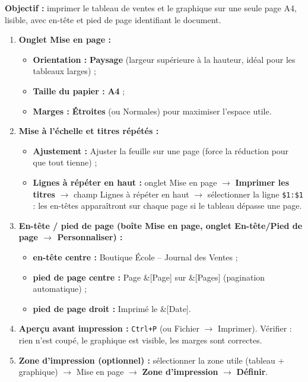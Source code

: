 \documentclass[11pt]{article}
\begin{document}
\begin{methode}
\textbf{Objectif :} imprimer le tableau de ventes et le graphique sur une seule page A4, lisible, avec en-tête et pied de page identifiant le document.
\begin{enumerate}
    \item \textbf{Onglet Mise en page :}
    \begin{itemize}
        \item \textbf{Orientation :} \textbf{Paysage} (largeur supérieure à la hauteur, idéal pour les tableaux larges) ;
        \item \textbf{Taille du papier :} \textbf{A4} ;
        \item \textbf{Marges :} \textbf{Étroites} (ou Normales) pour maximiser l'espace utile.
    \end{itemize}
    \item \textbf{Mise à l'échelle et titres répétés :}
    \begin{itemize}
        \item \textbf{Ajustement :} \og{}Ajuster la feuille sur une page\fg{} (force la réduction pour que tout tienne) ;
        \item \textbf{Lignes à répéter en haut :} onglet Mise en page $\rightarrow$ \textbf{Imprimer les titres} $\rightarrow$ champ \og{}Lignes à répéter en haut\fg{} $\rightarrow$ sélectionner la ligne \texttt{\$1:\$1} : les en-têtes apparaîtront sur chaque page si le tableau dépasse une page.
    \end{itemize}
    \item \textbf{En-tête / pied de page (boîte \og{}Mise en page\fg{}, onglet En-tête/Pied de page $\rightarrow$ Personnaliser) :}
    \begin{itemize}
        \item \textbf{en-tête centre :} \og{}Boutique École -- Journal des Ventes\fg{} ;
        \item \textbf{pied de page centre :} \og{}Page \&[Page] sur \&[Pages]\fg{} (pagination automatique) ;
        \item \textbf{pied de page droit :} \og{}Imprimé le \&[Date]\fg{}.
    \end{itemize}
    \item \textbf{Aperçu avant impression :} \texttt{Ctrl+P} (ou Fichier $\rightarrow$ Imprimer). Vérifier : rien n'est coupé, le graphique est visible, les marges sont correctes.
    \item \textbf{Zone d'impression (optionnel) :} sélectionner la zone utile (tableau + graphique) $\rightarrow$ Mise en page $\rightarrow$ \textbf{Zone d'impression} $\rightarrow$ \textbf{Définir}.
\end{enumerate}
\end{methode}
\end{document}
